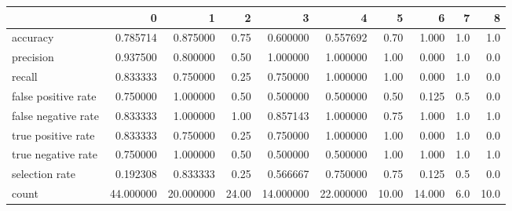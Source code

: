 \begin{tabular}{lrrrrrrrrr}
\toprule
{} &          0 &          1 &      2 &          3 &          4 &      5 &       6 &    7 &     8 \\
\midrule
accuracy            &   0.785714 &   0.875000 &   0.75 &   0.600000 &   0.557692 &   0.70 &   1.000 &  1.0 &   1.0 \\
precision           &   0.937500 &   0.800000 &   0.50 &   1.000000 &   1.000000 &   1.00 &   0.000 &  1.0 &   0.0 \\
recall              &   0.833333 &   0.750000 &   0.25 &   0.750000 &   1.000000 &   1.00 &   0.000 &  1.0 &   0.0 \\
false positive rate &   0.750000 &   1.000000 &   0.50 &   0.500000 &   0.500000 &   0.50 &   0.125 &  0.5 &   0.0 \\
false negative rate &   0.833333 &   1.000000 &   1.00 &   0.857143 &   1.000000 &   0.75 &   1.000 &  1.0 &   1.0 \\
true positive rate  &   0.833333 &   0.750000 &   0.25 &   0.750000 &   1.000000 &   1.00 &   0.000 &  1.0 &   0.0 \\
true negative rate  &   0.750000 &   1.000000 &   0.50 &   0.500000 &   0.500000 &   1.00 &   1.000 &  1.0 &   1.0 \\
selection rate      &   0.192308 &   0.833333 &   0.25 &   0.566667 &   0.750000 &   0.75 &   0.125 &  0.5 &   0.0 \\
count               &  44.000000 &  20.000000 &  24.00 &  14.000000 &  22.000000 &  10.00 &  14.000 &  6.0 &  10.0 \\
\bottomrule
\end{tabular}
